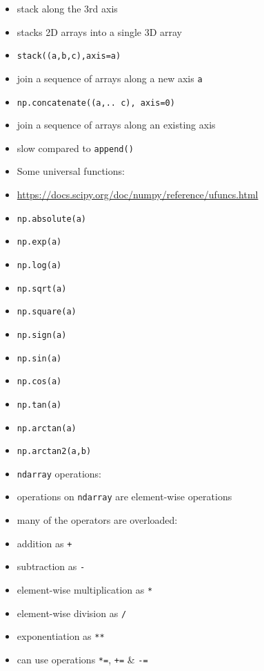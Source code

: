 \documentclass[onecolumn]{IEEEtran} %
\begin{document}
\begin{itemize}
        \bi
            \item stack along the 3rd axis
            \item stacks 2D arrays into a single 3D array
        \ei
        \item \verb|stack((a,b,c),axis=a)|
        \bi
            \item join a sequence of arrays along a new axis \verb|a|
        \ei
        \item \verb|np.concatenate((a,.. c), axis=0)|
        \bi
            \item join a sequence of arrays along an existing axis
            \item slow compared to \verb|append()|
        \ei
     \ei
     \item Some universal functions:
     \bi
        \item \url{https://docs.scipy.org/doc/numpy/reference/ufuncs.html}
        \item \verb|np.absolute(a)|
        \item \verb|np.exp(a)|
        \item \verb|np.log(a)|
        \item \verb|np.sqrt(a)|
        \item \verb|np.square(a)|
        \item \verb|np.sign(a)|
        \item \verb|np.sin(a)|
        \item \verb|np.cos(a)|
        \item \verb|np.tan(a)|
        \item \verb|np.arctan(a)|
        \item \verb|np.arctan2(a,b)|
     \ei
     \item  \verb|ndarray| operations:
     \bi
        \item operations on \verb|ndarray| are element-wise operations
        \item many of the operators are overloaded:
        \bi
            \item addition  as \verb|+|
            \item subtraction as \verb|-|
            \item element-wise multiplication as \verb|*|
            \item element-wise division as  \verb|/|
            \item exponentiation as \verb|**|
        \ei
        \item can use operations \verb|*=|, \verb|+=| \& \verb|-=|

\end{itemize}
\end{document}
